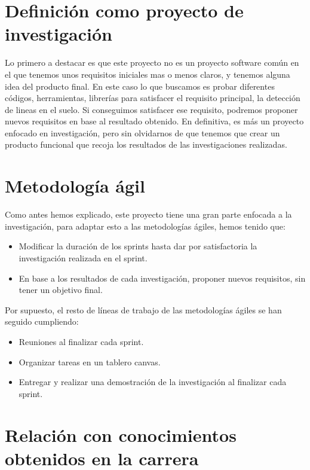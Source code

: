 
\section{Definición como proyecto de investigación}

Lo primero a destacar es que este proyecto no es un proyecto software común en el que tenemos unos requisitos iniciales mas o menos claros, y tenemos alguna idea del producto final. En este caso lo que buscamos es probar diferentes códigos, herramientas, librerías para satisfacer el requisito principal, la detección de lineas en el suelo. Si conseguimos satisfacer ese requisito, podremos proponer nuevos requisitos en base al resultado obtenido. En definitiva, es más un proyecto enfocado en investigación, pero sin olvidarnos de que tenemos que crear un producto funcional que recoja los resultados de las investigaciones realizadas.

\section{Metodología ágil}
Como antes hemos explicado, este proyecto tiene una gran parte enfocada a la investigación, para adaptar esto a las metodologías ágiles, hemos tenido que:

\begin{itemize}
	\item Modificar la duración de los sprints hasta dar por satisfactoria la investigación realizada en el sprint. 
	\item En base a los resultados de cada investigación, proponer nuevos requisitos, sin tener un objetivo final.
\end{itemize}

Por supuesto, el resto de líneas de trabajo de las metodologías ágiles se han seguido cumpliendo:

\begin{itemize}
	\item Reuniones al finalizar cada sprint.
	\item Organizar tareas en un tablero canvas.
	\item Entregar y realizar una demostración de la investigación al finalizar cada sprint.
\end{itemize}

\section{Relación con conocimientos obtenidos en la carrera}

